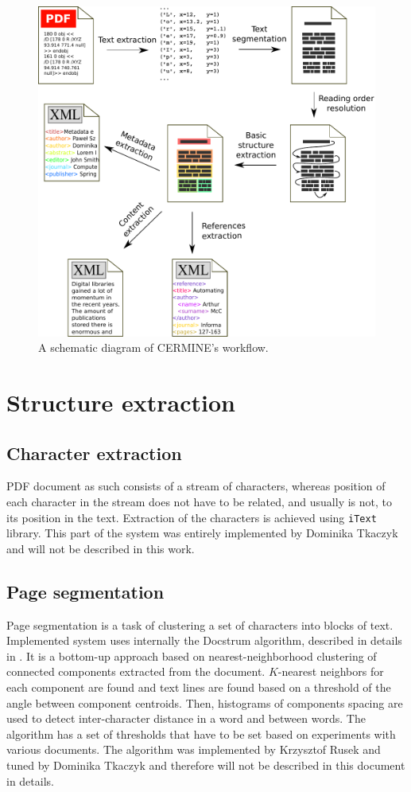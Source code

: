 \begin{figure}[ht]
  \centering
  \includegraphics[width=14cm]{graphics/pipeline}
  \caption{A schematic diagram of CERMINE's workflow.}
  \label{fig:pipeline}
\end{figure}

\section{Structure extraction}
\subsection{Character extraction}\label{sec:character_extraction}
PDF document as such consists of a stream of characters, whereas position of each character in the stream does not have to be related, and usually is not, to its position in the text. Extraction of the characters is achieved using \verb+iText+ library. This part of the system was entirely implemented by Dominika Tkaczyk and will not be described in this work.

\subsection{Page segmentation}\label{sec:page_segmentation}
Page segmentation is a task of clustering a set of characters into blocks of text. Implemented system uses internally the Docstrum algorithm, described in details in \cite{O'Gorman1993}. It is a bottom-up approach based on nearest-neighborhood clustering of connected components extracted from the document. $K$-nearest neighbors for each component are found and text lines are found based on a threshold of the angle between component centroids. Then, histograms of components spacing are used to detect inter-character distance in a word and between words. The algorithm has a set of thresholds that have to be set based on experiments with various documents. The algorithm was implemented by Krzysztof Rusek and tuned by Dominika Tkaczyk and therefore will not be described in this document in details.

